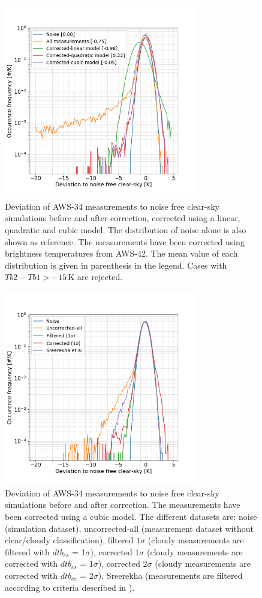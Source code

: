 \documentclass[12pt]{article}
\begin{document}
\begin{figure}[!p]
	\centering
	\includegraphics[height=85mm]{PDF_corrected_AWS-34_AWS-42_allfits}
	\caption{Deviation of AWS-34 measurements to noise free clear-sky
      simulations before and after correction, corrected using a linear,
      quadratic and cubic model. The distribution of noise alone is also shown
      as reference. The measurements have been corrected using brightness
      temperatures from AWS-42. The mean value of each distribution is given in
      parenthesis in the legend. Cases with $Tb2 - Tb1 > -15$\,K are rejected.}
	\label{fig:correction:c34-42:fit}
\end{figure}
%
\begin{figure}[!p]
	\centering
	\includegraphics[height=85mm]{PDF_corrected_AWS-34_AWS-42_all}
	\caption{Deviation of AWS-34 measurements to noise free clear-sky
      simulations before and after correction. The measurements have been
      corrected using a cubic model. The different datasets are: noise
      (simulation dataset), uncorrected-all (measurement dataset without
      clear/cloudy classification), filtered $1\sigma$ (cloudy measurements are
      filtered with $dtb_{cs}$ = 1$\sigma$), corrected $1\sigma$ (cloudy
      measurements are corrected with $dtb_{cs}$ = 1$\sigma$), corrected
      $2\sigma$ (cloudy measurements are corrected with $dtb_{cs}$ =
      2$\sigma$), Sreerekha (measurements are filtered according to criteria
      described in \citet{rekha2012potential}).}
	\label{fig:correction:c34-42}
\end{figure}
%
\end{document}
